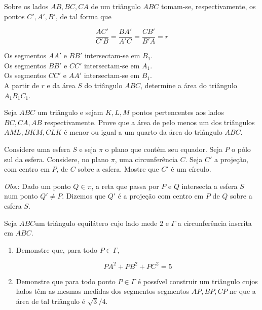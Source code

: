 \begin{questao}
  Sobre os lados $AB,BC,CA$ de um triângulo $ABC$
  tomam-se, respectivamente, os pontos
  $C',A',B'$, de tal forma que

  $$ \frac{AC'}{C'B} = \frac{BA'}{A'C} = \frac{CB'}{B'A} = r $$

  Os segmentos $AA'$ e $BB'$ intersectam-se em $B_1$.\\
  Os segmentos $BB'$ e $CC'$ intersectam-se em $A_1$.\\
  Os segmentos $CC'$ e $AA'$ intersectam-se em $B_1$.\\

  A partir de $r$ e da área $S$ do triângulo $ABC$, determine a
  área do triângulo $A_1B_1C_1$.
\end{questao}

\begin{questao}
  Seja $ABC$ um triângulo e sejam $K,L,M$ pontos
  pertencentes aos lados $BC,CA,AB$ respectivamente. Prove que a
  área de pelo menos um dos triângulos $AML, BKM, CLK$ é menor ou
  igual a um quarto da área do triângulo $ABC$.
\end{questao}

\begin{questao}
  Considere uma esfera $S$ e seja $\pi$ o plano que
  contém seu equador. Seja $P$ o pólo sul da esfera. Considere, no
  plano $\pi$, uma circunferência $C$. Seja $C'$ a projeção, com
  centro em $P$, de $C$ sobre a esfera. Mostre que $C'$ é um
  círculo.

  {\it Obs}.: Dado um ponto $Q \in \pi$, a reta que passa por $P$
  e $Q$ intersecta a esfera $S$ num ponto $Q' \not = P$. Dizemos
  que $Q'$ é a projeção com centro em $P$ de $Q$ sobre a esfera
  $S$.
\end{questao}

\begin{questao}
  Seja $ABC$um triângulo equilátero cujo lado mede $2$ e
  $\Gamma$ a circunferência inscrita em $ABC$.
  \begin{enumerate}

    \item Demonstre que, para todo $P \in \Gamma$,

    $$PA^2 + PB^2 +PC^2 = 5$$


    \item Demonstre que para todo ponto $P \in \Gamma$ é possível
    construir um triângulo cujos lados têm as mesmas medidas dos
    segmentos segmentos $AP,BP,CP$ ne que a área de tal triângulo é
    $\sqrt{3}/4$.
  \end{enumerate}
\end{questao}

